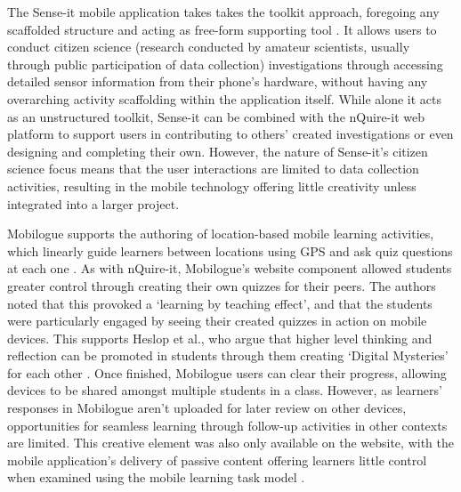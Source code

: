 The Sense-it mobile application takes takes the toolkit approach, foregoing any scaffolded structure and acting as free-form supporting tool \citep{Sharples2017}. It allows users to conduct citizen science (research conducted by amateur scientists, usually through public participation of data collection) investigations through accessing detailed sensor information from their phone’s hardware, without having any overarching activity scaffolding within the application itself. While alone it acts as an unstructured toolkit, Sense-it can be combined with the nQuire-it web platform to support users in contributing to others’ created investigations or even designing and completing their own. However, the nature of Sense-it’s citizen science focus means that the user interactions are limited to data collection activities, resulting in the mobile technology offering little creativity unless integrated into a larger project.

Mobilogue supports the authoring of location-based mobile learning activities, which linearly guide learners between locations using GPS and ask quiz questions at each one \citep{Giemza2013}. As with nQuire-it, Mobilogue’s website component allowed students greater control through creating their own quizzes for their peers. The authors noted that this provoked a `learning by teaching effect’, and that the students were particularly engaged by seeing their created quizzes in action on mobile devices. This supports Heslop et al., who argue that higher level thinking and reflection can be promoted in students through them creating ‘Digital Mysteries’ for each other \citep{Heslop2017}. Once finished, Mobilogue users can clear their progress, allowing devices to be shared amongst multiple students in a class. However, as learners’ responses in Mobilogue aren't uploaded for later review on other devices, opportunities for seamless learning through follow-up activities in other contexts are limited. This creative element was also only available on the website, with the mobile application’s delivery of passive content offering learners little control when examined using the mobile learning task model \citep{Taylor2006}.

